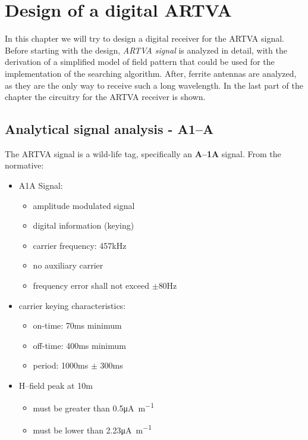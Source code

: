 
\chapter{Design of a digital ARTVA \label{ch:chapter2}}
\minitoc
\renewcommand{\arraystretch}{2}

In this chapter we will try to design a digital receiver for the ARTVA signal. Before starting with the design, \emph{ARTVA signal} is analyzed in detail, with the derivation of a simplified model of field pattern that could be used  for the implementation of the searching algorithm. After, ferrite antennas are analyzed, as they are the only way to receive such a long wavelength. In the last part of the chapter the circuitry for the ARTVA receiver is shown.



\section{Analytical signal analysis - A1--A \label{sec:a1asegnale}}

The ARTVA signal is a wild-life tag, specifically an \textbf{A--1A} signal. From the normative\cite{NormativaARVA}:
\begin{itemize}
\item A1A Signal:
	\begin{itemize}
	\item amplitude modulated signal
	\item digital information (keying)
	\item carrier frequency: \num{457}\si{\kilo\hertz}
	\item no auxiliary carrier
	\item frequency error shall not exceed $\pm$\num{80}\si{\hertz}
	\end{itemize}
\item carrier keying characteristics:
	\begin{itemize}
	\item on-time: \num{70}\si{\milli\second} minimum
	\item off-time: \num{400}\si{\milli\second} minimum
	\item period: \num{1000}\si{\milli\second} $\pm$ \num{300}\si{\milli\second}
	\end{itemize}
\item H--field peak at \num{10}\si{\meter}
	\begin{itemize}
	\item must be greater than \num{0.5}\si{\micro\ampere\per\meter}
	\item must be lower than \num{2.23}\si{\micro\ampere\per\meter}
	\end{itemize}
\end{itemize}

